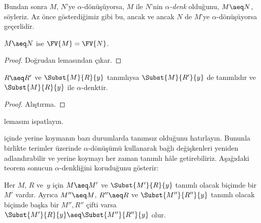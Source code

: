\documentclass[../../../include/open-logic-section]{subfiles}
\begin{document}
Bundan sonra $M$, $N$'ye $\alpha$-dönüşüyorsa, $M$ ile $N$'nin
\emph{$\alpha$-denk} olduğunu, $M\aeq N$, söyleriz. Az önce gösterdiğimiz
gibi bu, ancak ve ancak $N$ de $M$'ye $\alpha$-dönüşüyorsa geçerlidir.

\begin{thm}
  $M \aeq N$ ise $\FV{M} = \FV{N}$.
\end{thm}

\begin{proof}
  Doğrudan  lemasından çıkar.
\end{proof}

\begin{lem}
  $R \aeq R'$ ve $\Subst{M}{R}{y}$ tanımlıysa $\Subst{M}{R'}{y}$ de
  tanımlıdır ve $\Subst{M}{R}{y}$ ile $\alpha$-denktir.
\end{lem}

\begin{proof}
  Alıştırma.
\end{proof}

\begin{prob}
   lemasını ispatlayın.
\end{prob}

 içinde yerine koymanın bazı durumlarda tanımsız olduğunu
hatırlayın. Bununla birlikte terimler üzerinde $\alpha$-dönüşümü kullanarak
bağlı değişkenleri yeniden adlandırabilir ve yerine koymayı her zaman tanımlı
hâle getirebiliriz. Aşağıdaki teorem sonucun $\alpha$-denkliğini koruduğunu
gösterir:

\begin{thm}
  Her $M$, $R$ ve~$y$ için $M \aeq M'$ ve $\Subst{M'}{R}{y}$ tanımlı
  olacak biçimde bir $M'$ vardır. Ayrıca $M''\aeq M$, $R''\aeq R$ ve
  $\Subst{M''}{R''}{y}$ tanımlı olacak biçimde başka bir $M'',R''$ çifti
  varsa $\Subst{M'}{R}{y} \aeq \Subst{M''}{R''}{y}$ olur.
\end{thm}
\end{document}
